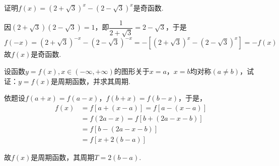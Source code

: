 
\begin{problem}
	证明$f\left( x \right) = \left( 2 + \sqrt{3} \right)^{x} - \left( 2 - \sqrt{3} \right)^{x}$是奇函数.

\begin{solution}
	因$\left( 2 + \sqrt{3} \right)\left( 2 - \sqrt{3} \right) = 1$，即$\dfrac{1}{2 + \sqrt{3}} = 2 - \sqrt{3}$，于是
$${f\left( - x \right) = \left( 2 + \sqrt{3} \right)^{- x} - \left( 2 - \sqrt{3} \right)^{- x}
}{ = - \left\lbrack \left( 2 + \sqrt{3} \right)^{x} - \left( 2 - \sqrt{3} \right)^{x} \right\rbrack
}{ = - f\left( x \right)}$$
故$f\left( x \right)$是奇函数.
\end{solution}


\end{problem}

\begin{problem}
	设函数$y = f\left( x \right),x \in \left( - \infty, + \infty \right)$的图形关于$x = a$，$x = b$均对称$\left( a \neq b \right)$，试证：$y = f\left( x \right)$是周期函数，并求其周期.

\begin{solution}
	依题设$f\left( a + x \right) = f\left( a - x \right)$，$f\left( b + x \right) = f\left( b - x \right)$，于是，
$$\begin{aligned}
f\left( x \right) &= f\left\lbrack a + \left( x - a \right) \right\rbrack = f\left\lbrack a - \left( x - a \right) \right\rbrack
\\
 &= f\left( 2a - x \right) = f\left\lbrack b + \left( 2a - x - b \right) \right\rbrack
\\
& = f\left\lbrack b - \left( 2a - x - b \right) \right\rbrack
\\
&= f\left\lbrack x + 2\left( b - a \right) \right\rbrack
\end{aligned}$$

故$f\left( x \right)$是周期函数，其周期$T = 2\left( b - a \right)$.
\end{solution}
\end{problem}

